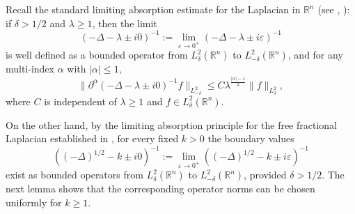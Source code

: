 \documentclass[12pt,a4paper]{amsart}
\numberwithin{equation}{section}
\theoremstyle{plain}
\theoremstyle{definition}
\begin{document}
Recall the standard limiting absorption estimate for the Laplacian in
$\mathbb{R}^n$ (see \cite{Agmon1975}, \cite[Section~7.1]{Yafaev}):
if $\delta > 1/2$ and $\lambda \geq 1$, then the limit
\begin{equation*}
    (-\Delta - \lambda \pm i0)^{-1}
    :=
    \lim_{\varepsilon\to 0^+} (-\Delta - \lambda \pm i\varepsilon)^{-1}
\end{equation*}
is well defined as a bounded operator from $L^2_\delta(\mathbb{R}^n)$ to
$L^2_{-\delta}(\mathbb{R}^n)$, and for any multi-index $\alpha$ with
$|\alpha| \leq 1$,
\begin{equation}\label{eq:laplacian_resolvent}
\|\partial^\alpha (-\Delta - \lambda \pm i0)^{-1} f\|_{L^2_{-\delta}}
\leq C \lambda^{\frac{|\alpha|-1}{2}} \|f\|_{L^2_\delta},
\end{equation}
where $C$ is independent of $\lambda \geq 1$ and
$f\in L^2_\delta(\mathbb{R}^n)$.

On the other hand, by the limiting absorption principle for the free
fractional Laplacian established in \cite{Ben-Artzi_Nemirovsky}, for every fixed $k>0$ the boundary values
\begin{equation}\label{frac_L_epsilon_eq_0}
    ((-\Delta)^{1/2}-k\pm i0)^{-1}
    :=
    \lim_{\varepsilon\to0^+}
    ((-\Delta)^{1/2}-k\pm i\varepsilon)^{-1}
\end{equation}
exist as bounded operators from $L^2_\delta(\mathbb{R}^n)$ to
$L^2_{-\delta}(\mathbb{R}^n)$, provided $\delta>1/2$.
The next lemma shows that the corresponding operator norms can be chosen uniformly for $k\geq 1$.
\end{document}
